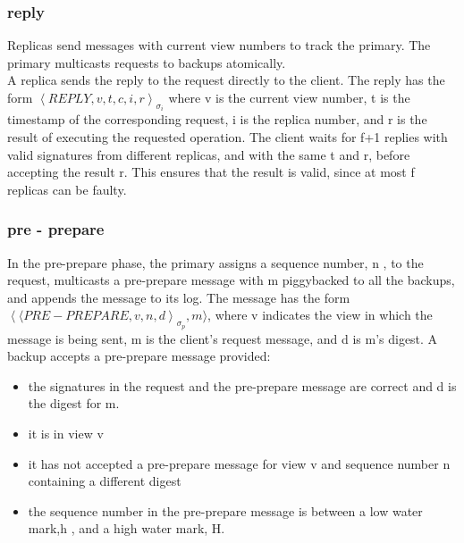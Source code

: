 \documentclass{article}
\begin{document}
\subsubsection{reply}
Replicas send messages with current view numbers to track the primary. The primary multicasts requests to backups atomically. \\
A replica sends the reply to the request directly to the client. The reply has the form $ \left\langle REPLY, v, t, c, i, r \right\rangle_{\sigma_i} $ where v is the current view number, t is the timestamp of the corresponding request, i is the replica number, and r is the result of executing the requested operation.
The client waits for f+1 replies with valid signatures
from different replicas, and with the same t and r, before
accepting the result r. This ensures that the result is valid,
since at most f replicas can be faulty.
\subsubsection{pre - prepare}
In the pre-prepare phase, the primary assigns a
sequence number, n , to the request, multicasts a pre-prepare message with m piggybacked to all the backups, and appends the message to its log. The message has the form $ \left \langle \langle PRE-PREPARE, v, n, d \right\rangle_{\sigma_p}, m \rangle $, where v indicates the view in which the message is being sent, m is the client’s request message, and d is m’s digest.
A backup accepts a pre-prepare message provided:
\begin{itemize}
    \item the signatures in the request and the pre-prepare
    message are correct and d is the digest for m.
    \item it is in view v
    \item it has not accepted a pre-prepare message for view v
    and sequence number n containing a different digest
    \item the sequence number in the pre-prepare message is
    between a low water mark,h , and a high water mark, H.
\end{itemize}
\end{document}
